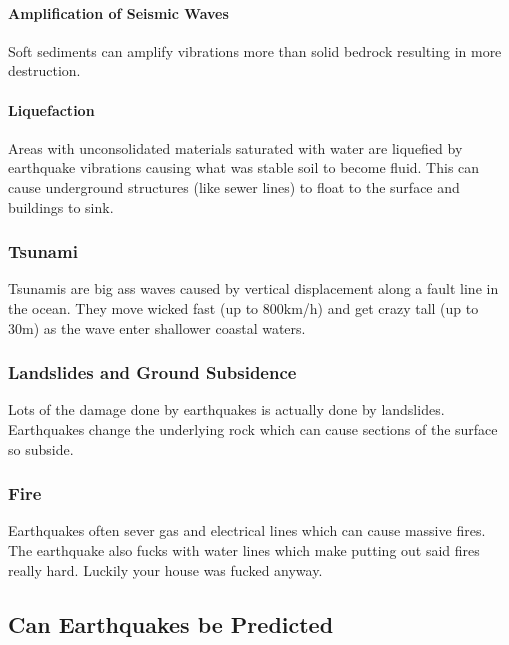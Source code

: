 \documentclass{article}
\begin{document}
\paragraph{Amplification of Seismic Waves} %
\label{par:amplification_of_seismic_waves}
Soft sediments can amplify vibrations more than solid bedrock resulting in more destruction.
\paragraph{Liquefaction} %
\label{par:liquefaction}
Areas with unconsolidated materials saturated with water are liquefied by earthquake vibrations causing what was stable soil to become fluid. This can cause underground structures (like sewer lines) to float to the surface and buildings to sink.

\subsubsection{Tsunami} %
\label{ssub:tsunami}
Tsunamis are big ass waves caused by vertical displacement along a fault line in the ocean. They move wicked fast (up to 800km/h) and get crazy tall (up to 30m) as the wave enter shallower coastal waters.
\subsubsection{Landslides and Ground Subsidence} %
\label{ssub:landslides_and_ground_subsidence}
Lots of the damage done by earthquakes is actually done by landslides. Earthquakes change the underlying rock which can cause sections of the surface so subside.
\subsubsection{Fire} %
\label{ssub:fire}
Earthquakes often sever gas and electrical lines which can cause massive fires. The earthquake also fucks with water lines which make putting out said fires really hard. Luckily your house was fucked anyway.
\subsection{Can Earthquakes be Predicted} %
\label{sub:can_earthquakes_be_predicted}
\end{document}
